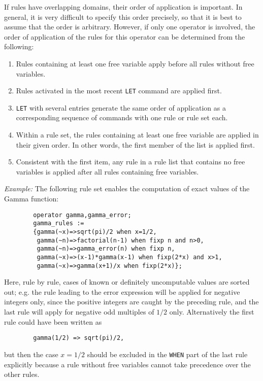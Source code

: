 If rules have overlapping domains, their order of application is
important.  In general, it is very difficult to specify this order
precisely, so that it is best to assume that the order is arbitrary.
However, if only one operator is involved, the order of application of the
rules for this operator can be determined from the following:

\begin{enumerate}
\item Rules containing at least one free variable apply before all rules
without free variables.
\item Rules activated in the most recent {\tt LET}
command are applied first.
\item {\tt LET} with several entries generate
the same order of application as a corresponding sequence of commands with
one rule or rule set each.
\item Within a rule set, the rules containing at least
one free variable are applied in their given order.
In other words, the first member of the list is applied first.
\item Consistent with the first item, any rule in a rule list that
contains no free variables is applied after all rules containing free
variables.
\end{enumerate}
{\it Example:} The following rule set enables the computation of exact
values of the Gamma function:
\begin{verbatim}
        operator gamma,gamma_error;
        gamma_rules :=
        {gamma(~x)=>sqrt(pi)/2 when x=1/2,
         gamma(~n)=>factorial(n-1) when fixp n and n>0,
         gamma(~n)=>gamma_error(n) when fixp n,
         gamma(~x)=>(x-1)*gamma(x-1) when fixp(2*x) and x>1,
         gamma(~x)=>gamma(x+1)/x when fixp(2*x)};
\end{verbatim}
Here, rule by rule, cases of known or definitely uncomputable values
are sorted out; e.g. the rule leading to the error expression
will be applied for negative integers only, since the positive
integers are caught by the preceding rule, and the
last rule will apply for negative odd multiples of $1/2$ only.
Alternatively the first rule could have been written as
\begin{verbatim}
        gamma(1/2) => sqrt(pi)/2,
\end{verbatim}
but then the case $x=1/2$ should be excluded in the {\tt WHEN} part of the
last rule explicitly because a rule without free variables cannot take
precedence over the other rules.


